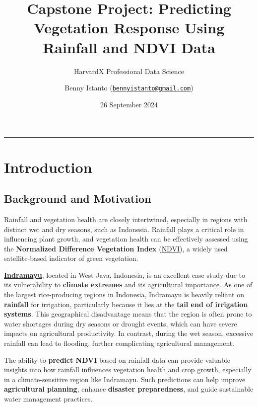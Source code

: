 \documentclass[
]{article}
\title{Capstone Project: Predicting Vegetation Response Using Rainfall
and NDVI Data}
\subtitle{HarvardX Professional Data Science}
\author{Benny Istanto
(\href{mailto:bennyistanto@gmail.com}{\nolinkurl{bennyistanto@gmail.com}})}
\date{26 September 2024}
\begin{document}
\maketitle

{
\setcounter{tocdepth}{2}
\tableofcontents
}
\begin{center}\rule{0.5\linewidth}{0.5pt}\end{center}

\section{Introduction}\label{introduction}

\subsection{Background and Motivation}\label{background-and-motivation}

Rainfall and vegetation health are closely intertwined, especially in
regions with distinct wet and dry seasons, such as Indonesia. Rainfall
plays a critical role in influencing plant growth, and vegetation health
can be effectively assessed using the \textbf{Normalized Difference
Vegetation Index}
(\href{https://en.wikipedia.org/wiki/Normalized_difference_vegetation_index}{NDVI}),
a widely used satellite-based indicator of green vegetation.

\href{https://en.wikipedia.org/wiki/Indramayu}{\textbf{Indramayu}},
located in West Java, Indonesia, is an excellent case study due to its
vulnerability to \textbf{climate extremes} and its agricultural
importance. As one of the largest rice-producing regions in Indonesia,
Indramayu is heavily reliant on \textbf{rainfall} for irrigation,
particularly because it lies at the \textbf{tail end of irrigation
systems}. This geographical disadvantage means that the region is often
prone to water shortages during dry seasons or drought events, which can
have severe impacts on agricultural productivity. In contrast, during
the wet season, excessive rainfall can lead to flooding, further
complicating agricultural management.

The ability to \textbf{predict NDVI} based on rainfall data can provide
valuable insights into how rainfall influences vegetation health and
crop growth, especially in a climate-sensitive region like Indramayu.
Such predictions can help improve \textbf{agricultural planning},
enhance \textbf{disaster preparedness}, and guide sustainable water
management practices.
\end{document}
